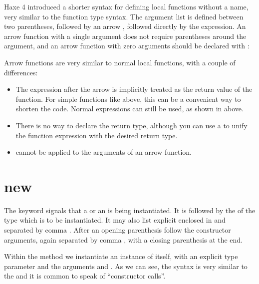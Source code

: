 Haxe 4 introduced a shorter syntax for defining local functions without a name, very similar to the function type syntax. The argument list is defined between two parentheses, followed by an arrow \expr{->}, followed directly by the expression. An arrow function with a single argument does not require parentheses around the argument, and an arrow function with zero arguments should be declared with :


Arrow functions are very similar to normal local functions, with a couple of differences:

\begin{itemize}
	\item The expression after the arrow is implicitly treated as the return value of the function. For simple functions like  above, this can be a convenient way to shorten the code. Normal  expressions can still be used, as shown in  above.
	\item There is no way to declare the return type, although you can use a  to unify the function expression with the desired return type.
	\item {} cannot be applied to the arguments of an arrow function.
\end{itemize}


\section{new}
\label{expression-new}

The  keyword signals that a  or an  is being instantiated. It is followed by the  of the type which is to be instantiated. It may also list explicit  enclosed in \expr{<>} and separated by comma \expr{,}. After an opening parenthesis \expr{(} follow the constructor arguments, again separated by comma \expr{,}, with a closing parenthesis \expr{)} at the end.


Within the  method we instantiate an instance of  itself, with an explicit type parameter  and the arguments  and . As we can see, the syntax is very similar to the  and it is common to speak of ``constructor calls''.



